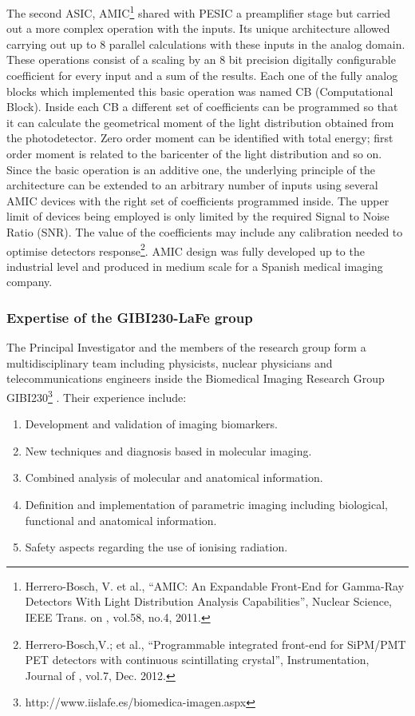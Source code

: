 The second ASIC, AMIC\footnote{Herrero-Bosch, V. et al., ``AMIC: An Expandable Front-End for Gamma-Ray
Detectors With Light Distribution Analysis Capabilities'', Nuclear Science,
IEEE Trans. on , vol.58, no.4, 2011.} shared with PESIC a preamplifier stage but carried
out a more complex operation with the inputs. Its unique architecture
allowed carrying out up to 8 parallel calculations with these inputs in the
analog domain. These operations consist of a scaling by an 8 bit precision
digitally configurable coefficient for every input and a sum of the results.
Each one of the fully analog blocks which implemented this basic operation
was named CB (Computational Block). Inside each CB a different set of
coefficients can be programmed so that it can calculate the geometrical
moment of the light distribution obtained from the photodetector. Zero order
moment can be identified with total energy; first order moment is related to
the baricenter of the light distribution and so on. Since the basic
operation is an additive one, the underlying principle of the architecture
can be extended to an arbitrary number of inputs using several AMIC devices
with the right set of coefficients programmed inside. The upper limit of
devices being employed is only limited by the required Signal to Noise Ratio
(SNR). The value of the coefficients may include any calibration needed to
optimise detectors response\footnote{Herrero-Bosch,V.; et al., ``Programmable integrated front-end for
SiPM/PMT PET detectors with continuous scintillating crystal'',
Instrumentation, Journal of , vol.7, Dec. 2012.}. AMIC design was fully developed up to the
industrial level and produced in medium scale for a Spanish medical imaging
company.

\subsubsection*{Expertise of the GIBI230-LaFe group}

The Principal Investigator and the members of the research group form a multidisciplinary team including physicists, nuclear physicians and telecommunications engineers inside the Biomedical Imaging Research Group GIBI230\footnote{http://www.iislafe.es/biomedica-imagen.aspx} . Their experience include:
\begin{enumerate}
\item Development and validation of imaging biomarkers.
\item New techniques and diagnosis based in molecular imaging.
\item Combined analysis of molecular and anatomical information.
\item Definition and implementation of parametric imaging including biological, functional and anatomical information.
\item Safety aspects regarding the use of ionising radiation. 
\end{enumerate}


